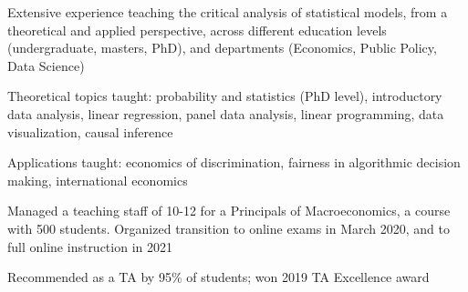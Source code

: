 \documentclass[10pt]{article}
\begin{document}
\begin{blist}

\item Extensive experience teaching the critical analysis of statistical models, from a theoretical and applied perspective, across different education levels (undergraduate, masters, PhD), and departments (Economics, Public Policy, Data Science)

\begin{blist}
\item Theoretical topics taught: 
    probability and statistics (PhD level), 
    introductory data analysis,
    linear regression, 
    panel data analysis, 
    linear programming, 
    data visualization, 
    causal inference
\item Applications taught: 
    economics of discrimination, 
    fairness in algorithmic decision making, 
    international economics
\end{blist}


\item Managed a teaching staff of 10-12 for a Principals of Macroeconomics, a course with 500 students. Organized transition to online exams in March 2020, and to full online instruction in 2021

\item Recommended as a TA by 95\% of students; won 2019 TA Excellence award




\end{blist}
\end{document}

